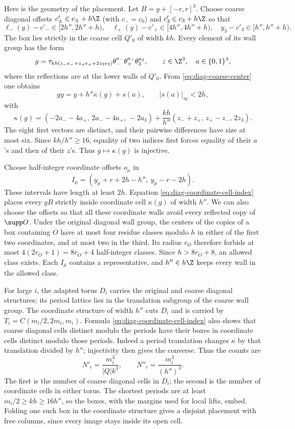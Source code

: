 Here is the geometry of the placement. Let $B=y+[-r,r]^3$. Choose
coarse diagonal offsets $c'_\pm\in c_\pm+h\Z$ (with
$c_-=c_0$) and $c'_3\in c_3+h\Z$ so that
\begin{equation}\label{eq:diag-coarse-center}
 \ell_-(y)-c'_-\in[2h'',2h''+h),\quad
 \ell_+(y)-c'_+\in[4h'',4h''+h),\quad
 y_3-c'_3\in[h'',h''+h).
\end{equation}
The box lies strictly in the coarse cell $Q'_0$ of width $kh$.
Every element of its wall group has the form
\[
 g=\tau_{kh(z_-e_-+z_+e_++2z_3e_3)}
            \theta_-^{a_-}\theta_+^{a_+}\theta_3^{a_3},
 \qquad z\in\Z^3,\quad a\in\{0,1\}^3,
\]
where the reflections are at the lower walls of $Q'_0$. From
\eqref{eq:diag-coarse-center} one obtains
\begin{equation}\label{eq:diag-coordinate-cell-index}
 gy=y+h''\kappa(g)+s(a),\qquad |s(a)|_\infty<2h,
\end{equation}
with
\[
 \kappa(g)=(-2a_--4a_+,\,2a_--4a_+,\,-2a_3)
       +\frac{kh}{h''}(z_-+z_+,\,z_+-z_-,\,2z_3).
\]
The eight first vectors are distinct, and their pairwise
differences have size at most six. Since $kh/h''\ge16$, equality
of two indices first forces equality of their $a$'s and then of
their $z$'s. Thus $g\mapsto\kappa(g)$ is injective.

Choose half-integer coordinate offsets $o_\mu$ in
\[
 I_\mu=(y_\mu+r+2h-h'',\ y_\mu-r-2h).
\]
These intervals have length at least $2h$. Equation
\eqref{eq:diag-coordinate-cell-index} places every $gB$ strictly
inside coordinate cell $\kappa(g)$ of width $h''$. We can also
choose the offsets so that all these coordinate walls avoid
every reflected copy of $\supp O$. Under the original diagonal
wall group, the centers of the copies of a box containing $O$
have at most four residue classes modulo $h$ in either of the
first two coordinates, and at most two in the third. Its radius
$r_O$ therefore forbids at most $4(2r_O+1)=8r_O+4$ half-integer
classes. Since $h>8r_O+8$, an allowed class exists. Each $I_\mu$
contains a representative, and $h''\in h\Z$ keeps every wall
in the allowed class.

For large $i$, the adapted torus $D_i$ carries the original and
coarse diagonal structures; its period lattice lies in the
translation subgroup of the coarse wall group. The coordinate
structure of width $h''$ cuts $D_i$ and is carried by
$T_i=C(m_i/2,2m_i,m_i)$. Formula
\eqref{eq:diag-coordinate-cell-index} also shows that coarse
diagonal cells distinct modulo the periods have their boxes in
coordinate cells distinct modulo those periods. Indeed a period
translation changes $\kappa$ by that translation divided by
$h''$; injectivity then gives the converse. Thus the counts are
\begin{equation}\label{eq:diag-coarse-cell-counts}
 N'_i=\frac{m_i^3}{|Q|k^3},\qquad
 N''_i=\frac{m_i^3}{(h'')^3}.
\end{equation}
The first is the number of coarse diagonal cells in $D_i$; the
second is the number of coordinate cells in either torus. The
shortest periods are at least $m_i/2\ge kh\ge16h''$, so the
boxes, with the margins used for local lifts, embed. Folding
one such box in the coordinate structure gives a disjoint
placement with free columns, since every image stays inside
its open cell.

